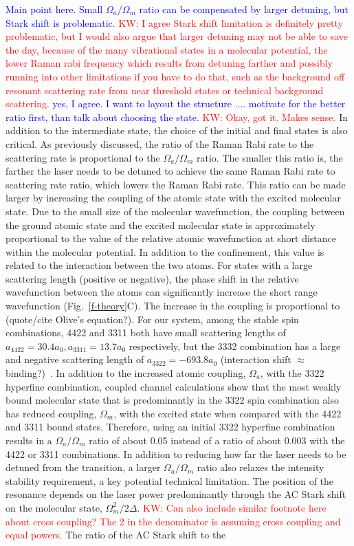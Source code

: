 \documentclass[aps,prl,twocolumn,groupedaddress]{revtex4-1}
\begin{document}
\textcolor{blue}{Main point here. Small $\Omega_a/\Omega_m$ ratio can be compensated by larger detuning, but Stark shift is problematic.} \textcolor{red}{KW: I agree Stark shift limitation is definitely pretty problematic, but I would also argue that larger detuning may not be able to save the day, because of the many vibrational states in a molecular potential, the lower Raman rabi frequency which results from detuning farther and possibly running into other limitations if you have to do that, such as the background off resonant scattering rate from near threshold states or technical background scattering.} \textcolor{blue}{yes, I agree. I want to layout the structure .... motivate for the better ratio first, than talk about choosing the state.} \textcolor{red}{KW: Okay, got it. Makes sense. }
In addition to the intermediate state, the choice of the initial and final states is also critical. As previously discussed, the ratio of the Raman Rabi rate to the scattering rate is proportional to the $ \Omega_a/\Omega_m $ ratio. The smaller this ratio is, the farther the laser needs to be detuned to achieve the same Raman Rabi rate to scattering rate ratio, which lowers the Raman Rabi rate. This ratio can be made larger by increasing the coupling of the atomic state with the excited molecular state. Due to the small size of the molecular wavefunction, the coupling between the ground atomic state and the excited molecular state is approximately proportional to the value of the relative atomic wavefunction at short distance within the molecular potential. In addition to the confinement, this value is related to the interaction between the two atoms. For states with a large scattering length (positive or negative), the phase shift in the relative wavefunction between the atoms can significantly increase the short range wavefunction (Fig.~\ref{f-theory}C). The increase in the coupling is proportional to (quote/cite Olive's equation?). For our system, among the stable spin combinations, 4422 and 3311 both have small scattering lengths of $ a_{4422}= 30.4a_0, a_{3311} = 13.7a_0 $ respectively, but the 3332 combination has a large and negative scattering length of $ a_{3322} = -693.8a_0 $ (interaction shift $\approx$ binding?)~\cite{Hood2019}. In addition to the increased atomic coupling, $ \Omega_a $, with the 3322 hyperfine combination, coupled channel calculations show that the most weakly bound molecular state that is predominantly in the 3322 spin combination also has reduced coupling, $ \Omega_m $, with the excited state when compared with the 4422 and 3311 bound states. Therefore, using an initial 3322 hyperfine combination results in a $ \Omega_a/\Omega_m$ ratio of about 0.05 instead of a ratio of about 0.003 with the 4422 or 3311 combinations. In addition to reducing how far the laser needs to be detuned from the transition, a larger $ \Omega_a/\Omega_m$ ratio also relaxes the intensity stability requirement, a key potential technical limitation. The position of the resonance depends on the laser power predominantly through the AC Stark shift on the molecular state, $ \Omega_m^2 / 2\Delta $. \textcolor{red}{KW: Can also include similar footnote here about cross coupling? The 2 in the denominator is assuming cross coupling and equal powers.} The ratio of the AC Stark shift to the 
\end{document}
